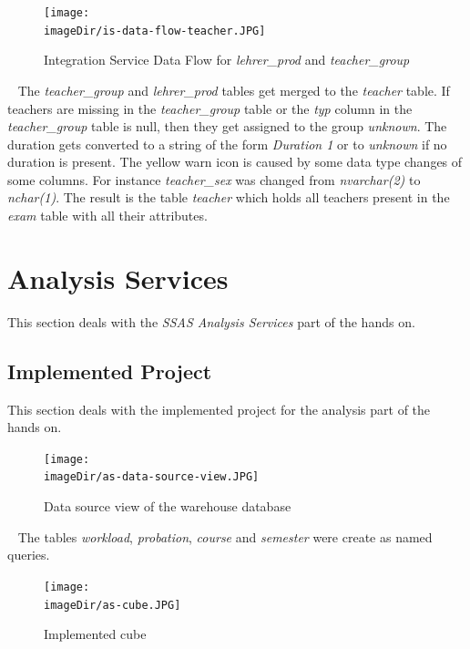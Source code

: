 \documentclass[11pt, a4paper, twoside]{article}   	%
\newcommand{\imageDir}{./images/}
\begin{document}
\begin{figure}[h]
\centering
\texttt{[image: \\imageDir/is-data-flow-teacher.JPG]}
\caption{Integration Service Data Flow for \emph{lehrer\_prod} and \emph{teacher\_group}}
\label{fig:is-data-flow-teacher}
\end{figure}
\ \newline
The \emph{teacher\_group} and \emph{lehrer\_prod} tables get merged to the \emph{teacher} table. If teachers are missing in the \emph{teacher\_group} table or the \emph{typ} column in the \emph{teacher\_group} table is null, then they get assigned to the group \emph{unknown}. The duration gets converted to a string of the form \emph{Duration 1} or to \emph{unknown} if no duration is present.
\newline
\newline
The yellow warn icon is caused by some data type changes of some columns. For instance \emph{teacher\_sex} was changed from \emph{nvarchar(2)} to \emph{nchar(1)}.
\newline
\newline
The result is the table \emph{teacher} which holds all teachers present in the \emph{exam} table with all their attributes.

\newpage

\section{Analysis Services}
This section deals with the \emph{SSAS Analysis Services} part of the hands on. 

\subsection{Implemented Project}
This section deals with the implemented project for the analysis part of the hands on.

\begin{figure}[h]
\centering
\texttt{[image: \\imageDir/as-data-source-view.JPG]}
\caption{Data source view of the warehouse database}
\label{fig:is-data-flow-teacher}
\end{figure}
\ \newline
The tables \emph{workload}, \emph{probation}, \emph{course} and \emph{semester} were create as named queries.

\begin{figure}[h]
\centering
\texttt{[image: \\imageDir/as-cube.JPG]}
\caption{Implemented cube}
\label{fig:is-data-flow-teacher}
\end{figure}
\ \newpage
\end{document}
